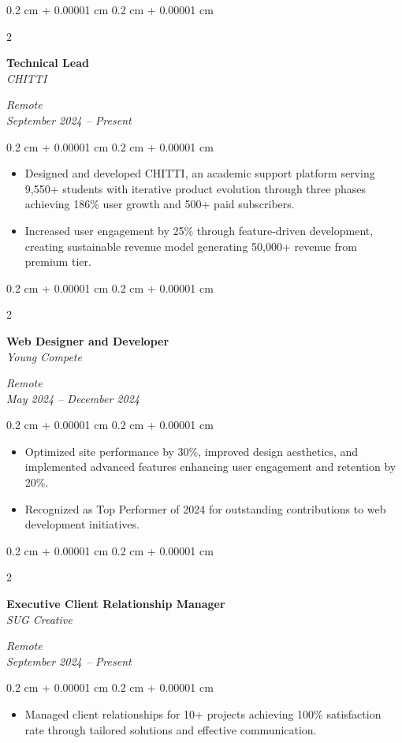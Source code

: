 \documentclass[10pt, letterpaper]{article}
\newenvironment{highlights}{
    \begin{itemize}[
        topsep=0.10 cm,
        parsep=0.10 cm,
        partopsep=0pt,
        itemsep=0pt,
        leftmargin=0.4 cm + 10pt
    ]
}{
    \end{itemize}
} %
\newenvironment{onecolentry}{
    \begin{adjustwidth}{
        0.2 cm + 0.00001 cm
    }{
        0.2 cm + 0.00001 cm
    }
}{
    \end{adjustwidth}
} %
\newenvironment{twocolentry}[2][]{
    \onecolentry
    \def\secondColumn{#2}
    \setcolumnwidth{\fill, 4.5 cm}
    \begin{paracol}{2}
}{
    \switchcolumn \raggedleft \secondColumn
    \end{paracol}
    \endonecolentry
} %
\begin{document}
    \vspace{0.2 cm}
    \begin{twocolentry}{
        \textit{Remote} \\
        \textit{September 2024 – Present}
    }
        \textbf{Technical Lead} \\
        \textit{CHITTI}
    \end{twocolentry}
    \vspace{0.10 cm}
    \begin{onecolentry}
        \begin{highlights}
            \item Designed and developed CHITTI, an academic support platform serving 9,550+ students with iterative product evolution through three phases achieving 186\% user growth and 500+ paid subscribers.
            \item Increased user engagement by 25\% through feature-driven development, creating sustainable revenue model generating 50,000+ revenue from premium tier.
        \end{highlights}
    \end{onecolentry}

    \vspace{0.2 cm}
    \begin{twocolentry}{
        \textit{Remote} \\
        \textit{May 2024 – December 2024}
    }
        \textbf{Web Designer and Developer} \\
        \textit{Young Compete}
    \end{twocolentry}
    \vspace{0.10 cm}
    \begin{onecolentry}
        \begin{highlights}
            \item Optimized site performance by 30\%, improved design aesthetics, and implemented advanced features enhancing user engagement and retention by 20\%.
            \item Recognized as Top Performer of 2024 for outstanding contributions to web development initiatives.
        \end{highlights}
    \end{onecolentry}

    \vspace{0.2 cm}
    \begin{twocolentry}{
        \textit{Remote} \\
        \textit{September 2024 – Present}
    }
        \textbf{Executive Client Relationship Manager} \\
        \textit{SUG Creative}
    \end{twocolentry}
    \vspace{0.10 cm}
    \begin{onecolentry}
        \begin{highlights}
            \item Managed client relationships for 10+ projects achieving 100\% satisfaction rate through tailored solutions and effective communication.
        \end{highlights}
    \end{onecolentry}
\end{document}
